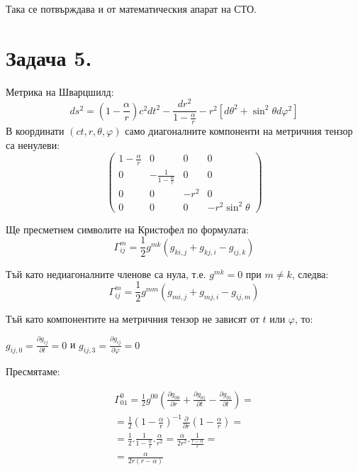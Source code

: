 \documentclass[a4paper,12pt]{article}
\begin{document}
Така се потвърждава и от математическия апарат на СТО.

\section*{Задача 5.}
Метрика на Шварцшилд:
\begin{equation*}
    ds^2 = \left(1 - \frac{\alpha}{r}\right)c^2dt^2 - \frac{dr^2}{1 - \frac{\alpha}{r}} - r^2\left[ d\theta^2 + \sin^2\theta d\varphi^2 \right]
\end{equation*}
В координати $(ct, r, \theta, \varphi)$ само диагоналните
компоненти на метричния тензор са ненулеви: 
\begin{equation*}
\begin{pmatrix}
    1-\frac{\alpha}{r} & 0 & 0 & 0\\
    0 & -\frac{1}{1-\frac{\alpha}{r}} & 0 & 0 \\
    0 & 0 & -r^2 & 0 \\
    0 & 0 & 0 & -r^2\sin^2\theta
\end{pmatrix}
\end{equation*}

Ще пресметнем символите на Кристофел по формулата:
\begin{equation*}
    \varGamma^m_{ij} = \frac{1}{2}g^{mk}(g_{ki,j} + g_{kj,i}-g_{ij,k})
\end{equation*}

Тъй като недиагоналните членове са нула, т.е. $g^{mk}=0$ при $m \neq k$, следва:
\begin{equation*}
    \varGamma^m_{ij} = \frac{1}{2}g^{mm}(g_{mi,j}+g_{mj,i} - g_{ij, m})
\end{equation*}

Тъй като компонентите на метричния тензор не зависят от $t$ или $\varphi$, то:

    $g_{ij, 0} = \frac{\partial g_{ij}}{\partial t} =0$ и 
    $g_{ij, 3} = \frac{\partial g_{ij}}{\partial \varphi} =0$

    Пресмятаме: 

    \begin{equation}
        \begin{aligned}
        \varGamma^0_{01} = \frac{1}{2}g^{00}\left(\frac{\partial g_{00}}{\partial r} + \frac{\partial g_{01}}{\partial t} - \frac{\partial g_{01}}{\partial t}\right) =\\
        = \frac{1}{2}\left( 1- \frac{\alpha}{r}\right)^{-1} \frac{\partial}{\partial r}\left(1 - \frac{\alpha}{r}\right) =\\
        = \frac{1}{2}.\frac{1}{1 - \frac{\alpha}{r}}.\frac{\alpha}{r^2} = \frac{\alpha}{2r^2}.\frac{1}{\frac{r-\alpha}{r}} =\\ 
        = \frac{\alpha}{2r(r-\alpha)}
        \end{aligned}
    \end{equation}
    \newline
\end{document}

